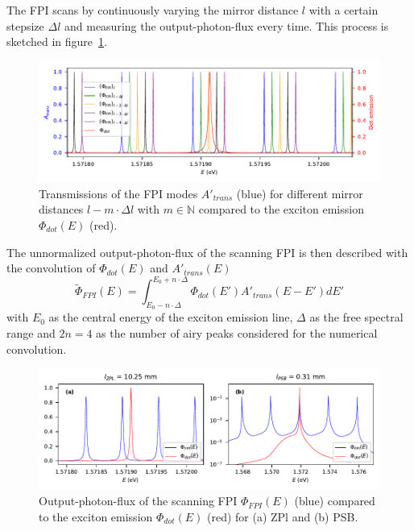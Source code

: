 The \ac{FPI} scans by continuously varying the mirror distance $l$ with a certain stepsize $\Delta l$ and measuring the output-photon-flux every time.
This process is sketched in figure~\ref{fig:simulation-comparison-dot-fabry-perot-sweep}.

\begin{figure}[H]
	\centering
	\includegraphics[width=\linewidth]{figures/fabry-perot/plots/simulation-comparison-dot-fabry-perot-sweep}
	\caption{Transmissions of the FPI modes $A'_{trans}$ (blue) for different mirror distances $l - m \cdot \Delta l$ with $m \in \mathbb{N}$ compared to the exciton emission $\Phi_{dot}(E)$ (red).}
	\label{fig:simulation-comparison-dot-fabry-perot-sweep}
\end{figure}


The unnormalized output-photon-flux of the scanning \ac{FPI} is then described with the convolution of $\Phi_{dot}(E)$ and $A'_{trans}(E)$
\begin{equation}
\tilde{\Phi}_{FPI}(E) = \int^{E_0 + n \cdot \Delta}_{E_0 - n  \cdot \Delta}  \Phi_{dot}(E')A'_{trans}(E - E') dE'
\end{equation}
with $E_0$ as the central energy of the exciton emission line, $\Delta$ as the free spectral range and $2n=4$ as the number of airy peaks considered for the numerical convolution.

\begin{figure}[H]
	\centering
	\includegraphics[width=\linewidth]{figures/fabry-perot/plots/simulation-comparison-dot-fabry-perot-output}
	\caption{Output-photon-flux of the scanning FPI $\Phi_{FPI}(E)$ (blue) compared to the exciton emission $\Phi_{dot}(E)$ (red) for (a) ZPl and (b) PSB.}
	\label{fig:simulation-comparison-dot-fabry-perot-output}
\end{figure}

